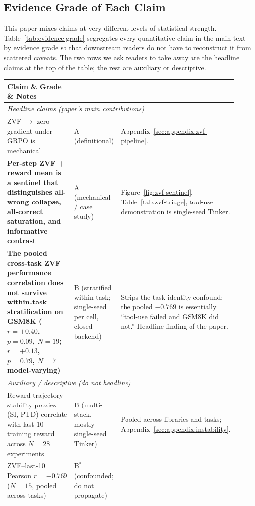 \documentclass{article}
\begin{document}
\subsection{Evidence Grade of Each Claim}
\label{sec:evidence-grade}
This paper mixes claims at very different levels of statistical strength.
Table~\ref{tab:evidence-grade} segregates every quantitative claim in the
main text by evidence grade so that downstream readers do not have to
reconstruct it from scattered caveats. The two rows we ask readers to take
away are the headline claims at the top of the table; the rest are
auxiliary or descriptive.

\begin{table}[htbp]
\centering\small
\setlength{\tabcolsep}{4pt}
\begin{tabular}{p{0.42\linewidth}p{0.18\linewidth}p{0.32\linewidth}}
\toprule
\textbf{Claim} \& \textbf{Grade} \& \textbf{Notes} \\
\midrule
\multicolumn{3}{l}{\textit{Headline claims (paper's main contributions)}} \\
\midrule
ZVF $\to$ zero gradient under GRPO is mechanical &
A (definitional) &
Appendix~\ref{sec:appendix:zvf-pipeline}. \\
\textbf{Per-step ZVF + reward mean is a sentinel that distinguishes
all-wrong collapse, all-correct saturation, and informative contrast} &
A (mechanical / case study) &
Figure~\ref{fig:zvf-sentinel}, Table~\ref{tab:zvf-triage}; tool-use
demonstration is single-seed Tinker. \\
\textbf{The pooled cross-task ZVF--performance correlation does not
survive within-task stratification on GSM8K
($r{=}+0.40$, $p{=}0.09$, $N{=}19$; $r{=}+0.13$, $p{=}0.79$, $N{=}7$
model-varying)} &
B (stratified within-task; single-seed per cell, closed backend) &
Strips the task-identity confound; the pooled $-0.769$ is essentially
``tool-use failed and GSM8K did not.'' Headline finding of the paper. \\
\midrule
\multicolumn{3}{l}{\textit{Auxiliary / descriptive (do not headline)}} \\
\midrule
Reward-trajectory stability proxies (SI, PTD) correlate with last-10
training reward across $N{=}28$ experiments &
B (multi-stack, mostly single-seed Tinker) &
Pooled across libraries and tasks; Appendix~\ref{sec:appendix:instability}. \\
ZVF--last-10 Pearson $r = -0.769$ ($N{=}15$, pooled across tasks) &
B$^{*}$ (confounded; do not propagate) &

\end{tabular}
\end{table}
\end{document}
